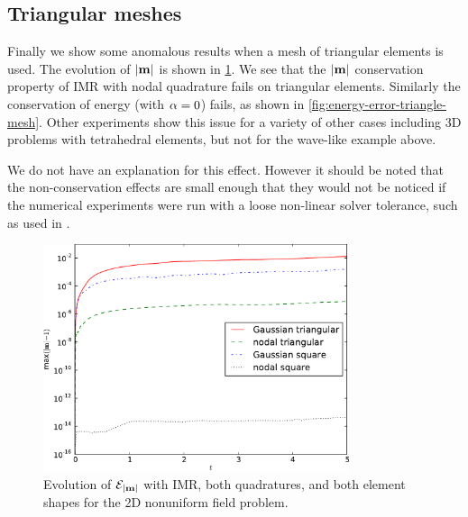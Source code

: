 \subsection{Triangular meshes}
\label{sec:triangular-meshes}

Finally we show some anomalous results when a mesh of triangular elements is used.
The evolution of $\left|{\boldsymbol{\mathrm{m}}} \right|$ is shown in \cref{fig:ml-error-triangle-mesh}.
We see that the $\left|{\boldsymbol{\mathrm{m}}} \right|$ conservation property of IMR with nodal quadrature fails on triangular elements.
Similarly the conservation of energy (with $\alpha = 0$) fails, as shown in \cref{fig:energy-error-triangle-mesh}.
Other experiments show this issue for a variety of other cases including 3D problems with tetrahedral elements, but not for the wave-like example above.

We do not have an explanation for this effect.
However it should be noted that the non-conservation effects are small enough that they would not be noticed if the numerical experiments were run with a loose non-linear solver tolerance, such as used in \eg \cite{Bartels2006}.

\begin{figure}
  \centering
  \includegraphics[width=0.8\textwidth]
  {plots/nonuniform-h-triangles-ml/mlengtherrormaxesvstimes.pdf}
  \caption{
    Evolution of $\mathcal{E}_{\left|{\boldsymbol{\mathrm{m}}} \right|}$
    with IMR, both quadratures, and both element shapes
    for the 2D nonuniform field problem.
}
  \label{fig:ml-error-triangle-mesh}
\end{figure}

